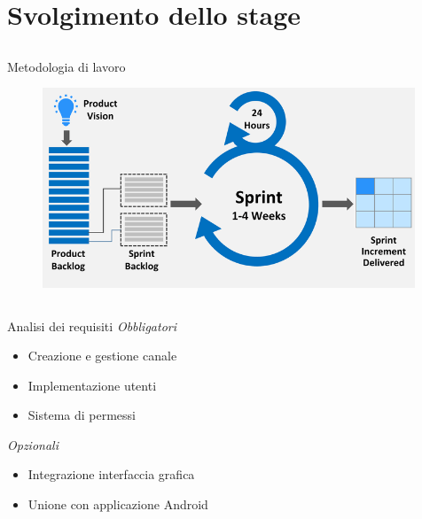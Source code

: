 \section{Svolgimento dello stage}
	\subsection{}
		\begin{frame}{Metodologia di lavoro}
			\begin{figure}
				\includegraphics[width=0.99\textwidth]{capitolo_3/immagini/scrum.png}
			\end{figure}
		\end{frame}
	\subsection{}
		\begin{frame}{Analisi dei requisiti}
			\emph{Obbligatori}
				\begin{itemize}
							\item Creazione e gestione canale
							\item Implementazione utenti
							\item Sistema di permessi
				\end{itemize}
			\emph{Opzionali}
				\begin{itemize}
						\item Integrazione interfaccia grafica
						\item Unione con applicazione Android
				\end{itemize}
			\end{frame}
